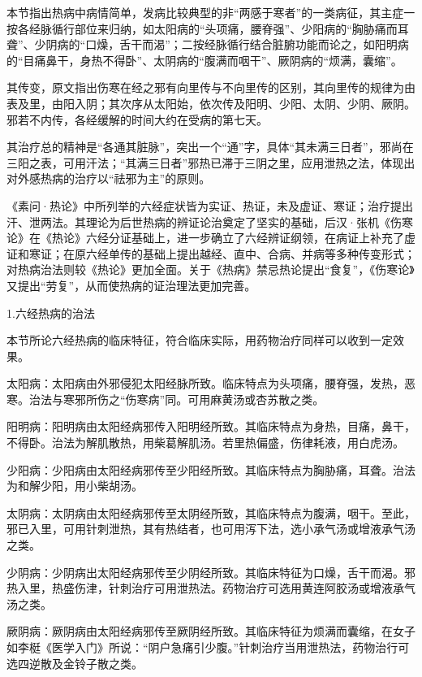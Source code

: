 \documentclass[draft,12pt]{ctexbook}
\begin{document}

本节指出热病中病情简单，发病比较典型的非“两感于寒者”的一类病征，其主症一按各经脉循行部位来归纳，如太阳病的“头项痛，腰脊强”、少阳病的“胸胁痛而耳聋”、少阴病的“口燥，舌干而渴”；二按经脉循行结合脏腑功能而论之，如阳明病的“目痛鼻干，身热不得卧”、太阴病的“腹满而咽干”、厥阴病的“烦满，囊缩”。

其传变，原文指出伤寒在经之邪有向里传与不向里传的区别，其向里传的规律为由表及里，由阳入阴；其次序从太阳始，依次传及阳明、少阳、太阴、少阴、厥阴。邪若不内传，各经缓解的时间大约在受病的第七天。

其治疗总的精神是“各通其脏脉”，突出一个“通”字，具体“其未满三日者”，邪尚在三阳之表，可用汗法；“其满三日者”邪热已滞于三阴之里，应用泄热之法，体现出对外感热病的治疗以“祛邪为主”的原则。

《素问·热论》中所列举的六经症状皆为实证、热证，未及虚证、寒证；治疗提出汗、泄两法。其理论为后世热病的辨证论治奠定了坚实的基础，后汉·张机《伤寒论》在《热论》六经分证基础上，进一步确立了六经辨证纲领，在病证上补充了虚证和寒证；在原六经单传的基础上提出越经、直中、合病、并病等多种传变形式；对热病治法则较《热论》更加全面。关于《热病》禁忌热论提出“食复”，《伤寒论》又提出“劳复”，从而使热病的证治理法更加完善。


1.六经热病的治法

本节所论六经热病的临床特征，符合临床实际，用药物治疗同样可以收到一定效果。

太阳病：太阳病由外邪侵犯太阳经脉所致。临床特点为头项痛，腰脊强，发热，恶寒。治法与寒邪所伤之“伤寒病”同。可用麻黄汤或杏苏散之类。

阳明病：阳明病由太阳经病邪传入阳明经所致。其临床特点为身热，目痛，鼻干，不得卧。治法为解肌散热，用柴葛解肌汤。若里热偏盛，伤律耗液，用白虎汤。

少阳病：少阳病由太阳经病邪传至少阳经所致。其临床特点为胸胁痛，耳聋。治法为和解少阳，用小柴胡汤。

太阴病：太阴病由太阳经病邪传至太阴经所致，其临床特点为腹满，咽干。至此，邪已入里，可用针刺泄热，其有热结者，也可用泻下法，选小承气汤或增液承气汤之类。

少阴病：少阴病出太阳经病邪传至少阴经所致。其临床特征为口燥，舌干而渴。邪热入里，热盛伤津，针刺治疗可用泄热法。药物治疗可选用黄连阿胶汤或增液承气汤之类。

厥阴病：厥阴病由太阳经病邪传至厥阴经所致。其临床特征为烦满而囊缩，在女子如李梃《医学入门》所说：“阴户急痛引少腹。”针刺治疗当用泄热法，药物治行可选四逆散及金铃子散之类。
\end{document}
